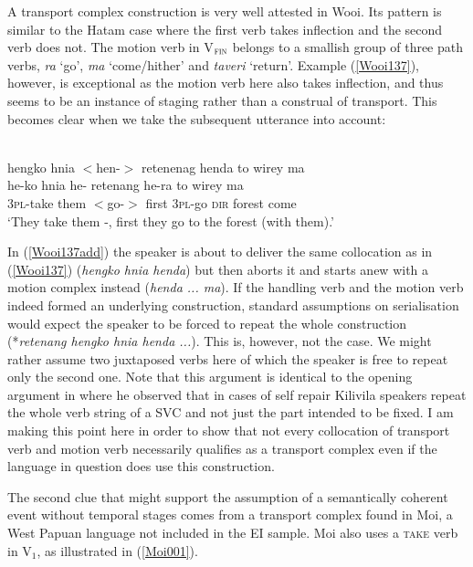 A transport complex construction is very well attested in Wooi. Its pattern is similar to the Hatam case where the first verb takes inflection and the second verb does not. The motion verb in V$_{\textsc{fin}}$ belongs to a smallish group of three path verbs, \textit{ra} `go', \textit{ma} `come/hither' and \textit{taveri} `return'. Example (\ref{Wooi137}), however, is exceptional as the motion verb here also takes inflection, and thus seems to be an instance of staging rather than a construal of transport. This becomes clear when we take the subsequent utterance into account:

\ea \label{Wooi137add}
\\
\glll hengko hnia $<$hen-$>$ retenenag henda to wirey ma \\
he-ko hnia he- retenang he-ra to wirey ma\\
\textsc{3}\textsc{pl}-take them $<$go-$>$ first \textsc{3}\textsc{pl}-go \textsc{dir} forest come \\
\glft `They take them -, first they go to the forest (with them).'\\
\z

In (\ref{Wooi137add}) the speaker is about to deliver the same collocation as in (\ref{Wooi137}) (\textit{hengko hnia henda}) but then aborts it and starts anew with a motion complex instead (\textit{henda ... ma}). If the handling verb and the motion verb indeed formed an underlying construction, standard assumptions on serialisation would expect the speaker to be forced to repeat the whole construction (*\textit{retenang hengko hnia henda ...}). This is, however, not the case. We might rather assume two juxtaposed verbs here of which the speaker is free to repeat only the second one. Note that this argument is identical to the opening argument in \citet{senft2008intro} where he observed that in cases of self repair Kilivila speakers repeat the whole verb string of a SVC and not just the part intended to be fixed. I am making this point here in order to show that not every collocation of transport verb and motion verb necessarily qualifies as a transport complex even if the language in question does use this construction.

The second clue that might support the assumption of a semantically coherent event without temporal stages comes from a transport complex found in Moi, a West Papuan language not included in the EI sample. Moi also uses a \textsc{take} verb in V$_{1}$, as illustrated in (\ref{Moi001}).

